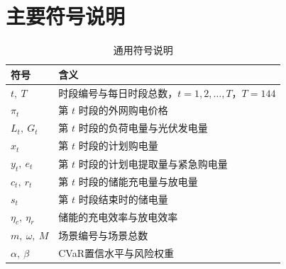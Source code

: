 \section{主要符号说明}

\begin{table}[H]
    \centering
    \caption{通用符号说明}
    \label{tab:main_symbols}
    \renewcommand{\arraystretch}{1.30}
    \begin{tabularx}{0.92\textwidth}{
        >{\centering\arraybackslash}p{}
        >{\centering\arraybackslash}X}
        \toprule
        符号 & 含义 \\
        \midrule
        $t,\ T$ & 时段编号与每日时段总数，$t=1,2,\ldots,T$，$T=144$ \\
        $\pi_t$ & 第 $t$ 时段的外网购电价格 \\
        $L_t,\ G_t$ & 第 $t$ 时段的负荷电量与光伏发电量 \\
        $x_t$ & 第 $t$ 时段的计划购电量 \\
        $y_t,\ e_t$ & 第 $t$ 时段的计划电提取量与紧急购电量 \\
        $c_t,\ r_t$ & 第 $t$ 时段的储能充电量与放电量 \\
        $s_t$ & 第 $t$ 时段结束时的储电量 \\
        $\eta_c,\ \eta_r$ & 储能的充电效率与放电效率 \\
        $m,\ \omega,\ M$ & 场景编号与场景总数 \\
        $\alpha,\ \beta$ & CVaR置信水平与风险权重 \\
        \bottomrule
    \end{tabularx}
\end{table}

